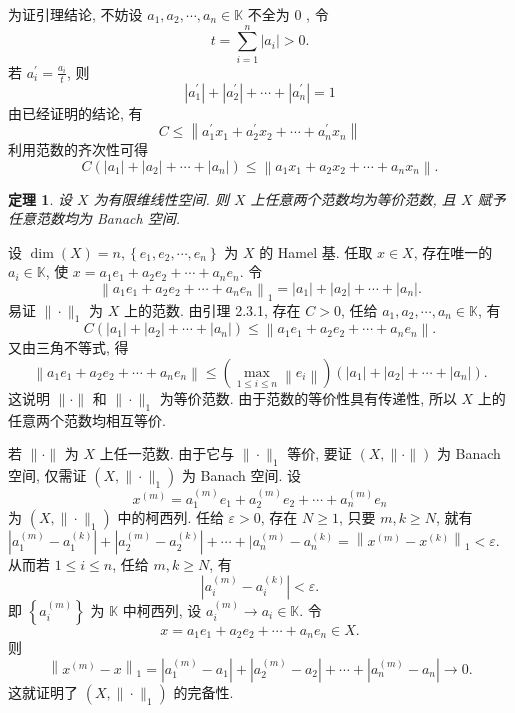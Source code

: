\documentclass[openany]{ctexbook}
\makeatletter
\theoremstyle{kaiti}
\newtheorem{theorem}{定理}[section]
\theoremstyle{normal}
\renewenvironment{proof}[1][\proofname]{\par
    \pushQED{\qed}%
    \normalfont \topsep6\p@\@plus6\p@\relax
    \trivlist
    \item\relax
    {\heiti #1}\hspace{2\labelsep}\ignorespaces
  }{%
    \popQED\endtrivlist\@endpefalse
  }
\makeatother
\begin{document}
\begin{proof}
为证引理结论, 不妨设 $a_1, a_2, \cdots, a_n \in \mathbb{K}$ 不全为 0 , 令
$$
t=\sum_{i=1}^n\left|a_{i}\right|>0.
$$
若 $a_{i}^{\prime}=\frac{a_{i}}{t}$, 则
$$
\left|a_1^{\prime}\right|+\left|a_2^{\prime}\right|+\cdots+\left|a_n^{\prime}\right|=1
$$
由已经证明的结论, 有
$$
C \leqslant\left\|a_1^{\prime} x_1+a_2^{\prime} x_2+\cdots+a_n^{\prime} x_n\right\|
$$
利用范数的齐次性可得
$$
C\left(\left|a_1\right|+\left|a_2\right|+\cdots+\left|a_n\right|\right) \leqslant\left\|a_1 x_1+a_2 x_2+\cdots+a_n x_n\right\|.
$$
\end{proof}

\begin{theorem}
设 $X$ 为有限维线性空间. 则 $X$ 上任意两个范数均为等价范数, 且 $X$ 赋予任意范数均为 Banach 空间.
\end{theorem}

\begin{proof}
设 $\operatorname{dim}(X)=n,\left\{e_1, e_2, \cdots, e_n\right\}$ 为 $X$ 的 Hamel 基. 任取 $x \in X$, 存在唯一的 $a_{i} \in \mathbb{K}$, 使 $x=a_1 e_1+a_2 e_2+\cdots+a_n e_n$. 令
$$
\left\|a_1 e_1+a_2 e_2+\cdots+a_n e_n\right\|_1=\left|a_1\right|+\left|a_2\right|+\cdots+\left|a_n\right|.
$$
易证 $\|\cdot\|_1$ 为 $X$ 上的范数. 由引理 2.3.1, 存在 $C>0$, 任给 $a_1, a_2, \cdots, a_n \in \mathbb{K}$, 有
$$
C\left(\left|a_1\right|+\left|a_2\right|+\cdots+\left|a_n\right|\right) \leqslant\left\|a_1 e_1+a_2 e_2+\cdots+a_n e_n\right\|.
$$
又由三角不等式, 得
$$
\left\|a_1 e_1+a_2 e_2+\cdots+a_n e_n\right\| \leqslant\left(\max_{1 \leqslant i \leqslant n}\left\|e_{i}\right\|\right)\left(\left|a_1\right|+\left|a_2\right|+\cdots+\left|a_n\right|\right).
$$
这说明 $\|\cdot\|$ 和 $\|\cdot\|_1$ 为等价范数. 由于范数的等价性具有传递性, 所以 $X$ 上的任意两个范数均相互等价.

若 $\|\cdot\|$ 为 $X$ 上任一范数. 由于它与 $\|\cdot\|_1$ 等价, 要证 $(X,\|\cdot\|)$ 为 Banach 空间, 仅需证 $\left(X,\|\cdot\|_1\right)$ 为 Banach 空间. 设
$$
x^{(m)}=a_1^{(m)} e_1+a_2^{(m)} e_2+\cdots+a_n^{(m)} e_n
$$
为 $\left(X,\|\cdot\|_1\right)$ 中的柯西列. 任给 $\varepsilon>0$, 存在 $N \geqslant 1$, 只要 $m, k \geqslant N$, 就有 $\left|a_1^{(m)}-a_1^{(k)}\right|+\left|a_2^{(m)}-a_2^{(k)}\right|+\cdots+\mid a_n^{(m)}-a_n^{(k)}=\left\|x^{(m)}-x^{(k)}\right\|_1<\varepsilon.$ 从而若 $1 \leqslant i \leqslant n$, 任给 $m, k \geqslant N$, 有
$$
\left|a_{i}^{(m)}-a_{i}^{(k)}\right|<\varepsilon.
$$
即 $\left\{a_{i}^{(m)}\right\}$ 为 $\mathbb{K}$ 中柯西列, 设 $a_{i}^{(m)} \rightarrow a_{i} \in \mathbb{K}$. 令
$$
x=a_1 e_1+a_2 e_2+\cdots+a_n e_n \in X.
$$
则
$$
\left\|x^{(m)}-x\right\|_1=\left|a_1^{(m)}-a_1\right|+\left|a_2^{(m)}-a_2\right|+\cdots+\left|a_n^{(m)}-a_n\right| \rightarrow 0.
$$
这就证明了 $\left(X,\|\cdot\|_1\right)$ 的完备性.
\end{proof}
\end{document}
